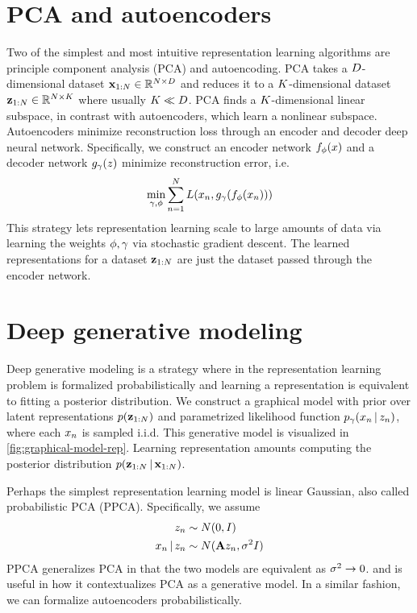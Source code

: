 \section{PCA and autoencoders}
Two of the simplest and most intuitive
representation learning algorithms
are principle component analysis (PCA)
and autoencoding.
PCA takes a $D$-dimensional dataset 
$\mathbf{x}_{1:N} \in \mathbb{R}^{N \times D}$ and
reduces it to a $K$-dimensional
dataset $\mathbf{z}_{1:N} \in \mathbb{R}^{N \times K}$
where usually $K \ll D$.
PCA finds a $K$-dimensional
linear subspace,
in contrast with autoencoders,
which learn a nonlinear subspace.
Autoencoders
minimize reconstruction loss
through an encoder
and decoder deep neural network.
Specifically, we construct
an encoder network $f_\phi(x)$
and a decoder network $g_\gamma(z)$
minimize reconstruction error, i.e.
\begin{align*}
\min_{\gamma, \phi} \sum _{n = 1}^N L(x_n, g_\gamma(f_\phi(x_n)))
\end{align*}
This strategy lets representation
learning scale to large amounts of data
via learning the weights $\phi, \gamma$
via stochastic gradient descent.
The learned representations for a dataset
$\mathbf{z}_{1:N}$ are just the dataset
passed through the encoder network.

\section{Deep generative modeling}
Deep generative modeling is a strategy
where in the representation learning problem
is formalized probabilistically
and learning a representation
is equivalent to fitting a posterior
distribution.
We construct
a graphical model
with prior over 
latent representations $p(\mathbf{z}_{1:N})$
and parametrized likelihood function $p_\gamma(x_n \,|\, z_n)$,
where each $x_n$ is sampled i.i.d.
This generative model is visualized in
\autoref{fig:graphical-model-rep}.
Learning representation amounts
computing the posterior distribution 
$p(\mathbf{z}_{1:N} \,|\, \mathbf{x}_{1:N})$.

Perhaps the simplest representation learning
model is linear Gaussian, also
called probabilistic PCA (PPCA). Specifically,
we assume
\begin{align*}
    z_n &\sim N(0, I) \\
    x_n \,|\, z_n &\sim N(\mathbf{A} z_n, \sigma^2 I)
\end{align*}
PPCA generalizes PCA in that the two models
are equivalent as $\sigma^2 \rightarrow 0$.
and is useful
in how it contextualizes
PCA as a generative model.
In a similar fashion, we
can formalize autoencoders
probabilistically.

